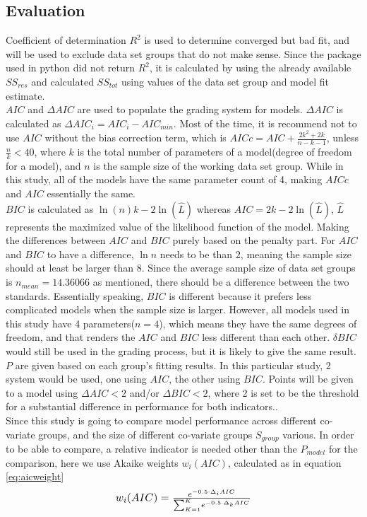 \documentclass[11pt]{article}
\begin{document}
\subsection{Evaluation}\label{evaluation}
Coefficient of determination $R^2$ is used to determine converged but bad fit, and will be used to exclude data set groups that do not make sense. Since the package used in python did not return $R^2$, it is calculated by using the already available $SS_{res}$ and calculated $SS_{tot}$ using values of the data set group and model fit estimate.\\
$AIC$ and $\Delta AIC$ are used to populate the grading system for models. $\Delta AIC$ is calculated as  $\Delta AIC_{i} = AIC_{i} - AIC_{min}$. Most of the time, it is recommend not to use $AIC$ without the bias correction term, which is $AICc =  AIC + \frac{2k^2+2k}{n-k-1}$, unless $\frac{n}{k} < 40$, where $k$ is the  total number of parameters of a model(degree of freedom for a model), and $n$ is the sample size of the working data set group\parencite{burnham2002practical}. While in this study, all of the models have the same parameter count of 4, making $AICc$ and $AIC$ essentially the same.\\
$BIC$ is calculated as $\ln(n)k - 2\ln(\hat L)$ whereas $AIC = 2k - 2\ln(\hat L)$, $\hat L$ represents the maximized value of the likelihood function of the model. Making the differences between $AIC$ and $BIC$ purely based on the penalty part. For $AIC$ and $BIC$ to have a difference, $\ln n$ needs to be than $2$, meaning the sample size should at least be larger than $8$. Since the average sample size of data set groups is $n_{mean} = 14.36066$ as mentioned, there should be a difference between the two standards. Essentially speaking, $BIC$ is different because it prefers less complicated models when the sample size is larger. However, all models used in this study have 4 parameters($n=4$), which means they have the same degrees of freedom, and that renders the $AIC$ and $BIC$ less different than each other. $\delta BIC$ would still be used in the grading process, but it is likely to give the same result.\\
$P$ are given based on each group's fitting results. In this particular study, 2 system would be used, one using $AIC$, the other using $BIC$. Points will be given to a model using $\Delta AIC < 2$ and/or $\Delta BIC < 2$, where 2 is set to be the threshold for a substantial difference in performance for both indicators.\parencite{burnham2004multimodel, 10.2307/2291091}. \\
Since this study is going to compare model performance across different co-variate groups, and the size of different co-variate groups $S_{group}$ various. In order to be able to compare, a relative indicator is needed other than the $P_{model}$ for the comparison, here we use Akaike weights $w_{i}(AIC)$\parencite{wagenmakers2004aic}, calculated as in equation \ref{eq:aicweight}\\
\begin{equation}
\resizebox{.4\hsize}{!}{$w_{i}(AIC)=
\frac
{e^{-0.5\cdot{\Delta}_i AIC}}
{{\sum_{K=1}^K}{e^{-0.5\cdot{\Delta}_k AIC}}}$}\label{eq:aicweight}
\end{equation}
\end{document}
